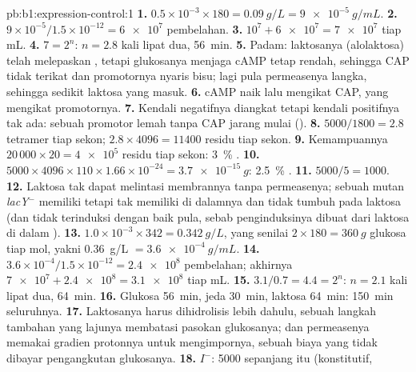 \begin{solution}{pb:b1:expression-control:1}
\textbf{1.} $0.5\times 10^{-3}\times 180 = \qty{0.09}{g/L} =
\qty{9e-5}{g/mL}$.
\textbf{2.} $9\times 10^{-5}/1.5\times 10^{-12} = \num{6e7}$ pembelahan.
\textbf{3.} $10^7 + \num{6e7} = \num{7e7}$  tiap mL.
\textbf{4.} $7 = 2^n$: $n = 2.8$ kali lipat dua, \qty{56}{min}.
\textbf{5.} Padam: laktosanya (alolaktosa) telah melepaskan
, tetapi glukosanya menjaga cAMP tetap rendah, sehingga CAP
tidak terikat dan promotornya nyaris bisu; lagi pula permeasenya
langka, sehingga sedikit laktosa yang masuk.
\textbf{6.} cAMP naik lalu mengikat CAP, yang mengikat promotornya.
\textbf{7.} Kendali negatifnya diangkat tetapi kendali positifnya tak
ada: sebuah promotor lemah tanpa CAP jarang mulai ().
\textbf{8.} $5000/1800 = 2.8$ tetramer tiap sekon; $2.8\times 4096 =
\num{11400}$ residu tiap sekon.
\textbf{9.} Kemampuannya $20\,000\times 20 = \num{4e5}$ residu tiap sekon:
\qty{3}{\%} .
\textbf{10.} $5000\times 4096\times 110\times 1.66\times 10^{-24} =
\qty{3.7e-15}{g}$: \qty{2.5}{\%}  .
\textbf{11.} $5000/5 = 1000$.
\textbf{12.} Laktosa tak dapat melintasi membrannya tanpa permeasenya;
sebuah mutan \emph{lacY}$^-$ memiliki  tetapi tak memiliki
 di dalamnya dan tidak tumbuh pada laktosa (dan tidak
terinduksi dengan baik pula, sebab penginduksinya dibuat dari laktosa
di dalam ).
\textbf{13.} $1.0\times 10^{-3}\times 342 = \qty{0.342}{g/L}$, yang
senilai $2\times 180 = \qty{360}{g}$ glukosa tiap mol, yakni
\qty{0.36}{g/L}
$= \qty{3.6e-4}{g/mL}$.
\textbf{14.} $3.6\times 10^{-4}/1.5\times 10^{-12} = \num{2.4e8}$
pembelahan; akhirnya $\num{7e7} + \num{2.4e8} = \num{3.1e8}$ tiap mL.
\textbf{15.} $3.1/0.7 = 4.4 = 2^n$: $n = 2.1$ kali lipat dua,
\qty{64}{min}.
\textbf{16.} Glukosa \qty{56}{min}, jeda \qty{30}{min}, laktosa
\qty{64}{min}: \qty{150}{min} seluruhnya.
\textbf{17.} Laktosanya harus dihidrolisis lebih dahulu, sebuah langkah
 tambahan yang lajunya membatasi pasokan glukosanya; dan
permeasenya memakai gradien protonnya untuk mengimpornya, sebuah biaya
yang tidak dibayar pengangkutan glukosanya.
\textbf{18.} $I^-$:  \num{5000} sepanjang itu (konstitutif,

\end{solution}
